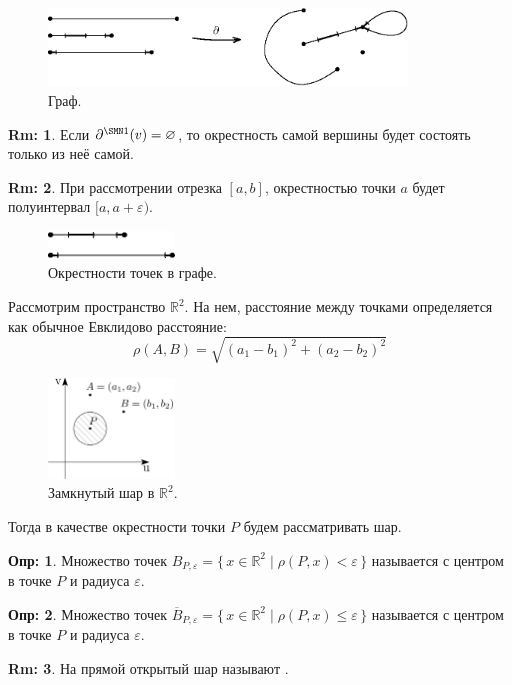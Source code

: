 \documentclass[12pt]{article}
\newcommand{\MR}{\mathbb{R}}
\newcommand{\VN}{\varnothing}
\newcommand{\VE}{\varepsilon}
\theoremstyle{definition}
\newtheorem{defn}{Опр:}
\newtheorem{rem}{Rm:}
\begin{document}
\begin{figure}[H]
	\centering
	\includegraphics[width=0.85\textwidth]{1_6.eps}
	\caption{Граф.}
	\label{1_6}
\end{figure}

\begin{rem}
	Если $\partial^{\SMN1}(v) = \VN$, то окрестность самой вершины будет состоять только из неё самой.
\end{rem}
\begin{rem}
	При рассмотрении отрезка $[a,b]$, окрестностью точки $a$ будет полуинтервал $[a, a+ \VE)$.
\end{rem}

\begin{figure}[H]
	\centering
	\includegraphics[width=0.3\textwidth]{1_7.eps}
	\caption{Окрестности точек в графе.}
	\label{1_7}
\end{figure}
Рассмотрим пространство $\MR^2$. На нем, расстояние между точками определяется как обычное Евклидово расстояние: 
$$
	\rho(A,B) = \sqrt{(a_1 - b_1)^2 + (a_2 - b_2)^2}
$$ 
\begin{figure}[H]
	\centering
	\includegraphics[width=0.3\textwidth]{1_8.png}
	\caption{Замкнутый шар в $\MR^2$.}
	\label{1_8}
\end{figure}
Тогда в качестве окрестности точки $P$ будем рассматривать шар.
\begin{defn}
	Множество точек  $B_{P,\VE} = \{\,x \in \MR^2 \mid \rho(P,x) < \VE \,\}$ называется  с центром в точке $P$ и радиуса $\VE$.
\end{defn}
\begin{defn}
	Множество точек  $\overline{B}_{P,\VE} = \{\,x \in \MR^2 \mid \rho(P,x) \leq \VE \,\}$ называется  с центром в точке $P$ и радиуса $\VE$.
\end{defn}
\begin{rem}
	На прямой открытый шар называют .
\end{rem}
\end{document}
